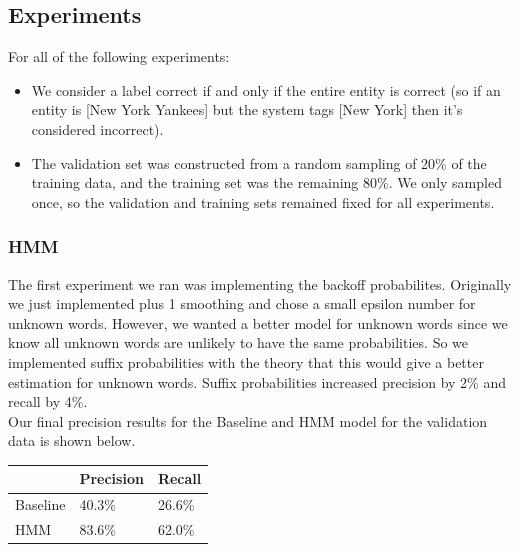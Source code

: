 \documentclass[12pt]{article}
\begin{document}
\subsection{Experiments}
For all of the following experiments:
\begin{itemize}
	\item We consider a label correct if and only if the entire entity is correct (so if an entity is [New York Yankees] but the system tags [New York] then it's considered incorrect).
	\item The validation set was constructed from a random sampling of 20\% of the training data, and the training set was the remaining 80\%. We only sampled once, so the validation and training sets remained fixed for all experiments.
\end{itemize}
\subsubsection{HMM}
The first experiment we ran was implementing the backoff probabilites. Originally we just implemented plus 1 smoothing and chose a small epsilon number for unknown words. However, we wanted a better model for unknown words since we know all unknown words are unlikely to have the same probabilities. So we implemented suffix probabilities with the theory that this would give a better estimation for unknown words. Suffix probabilities increased precision by 2\% and recall by 4\%.\\
Our final precision results for the Baseline and HMM model for the validation data is shown below.\\
\newline
\begin{tabular}{|l|l|l|}
\hline
& Precision & Recall \\
\hline
Baseline & 40.3\% & 26.6\%\\
\hline
HMM      & 83.6\% & 62.0\%\\
\hline
\end{tabular}
\end{document}
